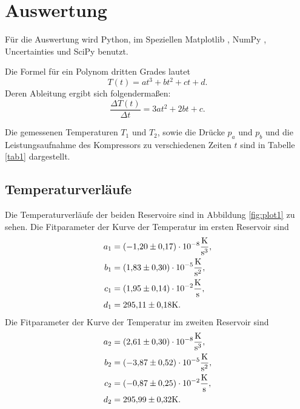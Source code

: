 \section{Auswertung}
\label{sec:Auswertung}
Für die Auswertung wird Python, im Speziellen Matplotlib \cite{matplotlib}, NumPy \cite{numpy}, Uncertainties \cite{uncertainties}
und SciPy \cite{scipy} benutzt.

Die Formel für ein Polynom dritten Grades lautet 
\begin{equation}
    T(t)= at^3+bt^2+ct+d.
    \label{eqn:poly3}
\end{equation}
Deren Ableitung ergibt sich folgendermaßen: 
\begin{equation}
    \frac{\Delta T(t)}{\Delta t}=3at^2+2bt+c.
    \label{eqn:poly3ableitung}
\end{equation}

\noindent Die gemessenen Temperaturen $T_1$ und $T_2$, sowie die Drücke
$p_a$ und $p_b$ und die Leistungsaufnahme des Kompressors
zu verschiedenen Zeiten $t$ sind in Tabelle \ref{tab1}
dargestellt.


\subsection{Temperaturverläufe}
Die Temperaturverläufe der beiden Reservoire sind in Abbildung
\ref{fig:plot1} zu sehen.
Die Fitparameter der Kurve der Temperatur im ersten Reservoir sind 
\begin{align*}
    a_1 &= \num{-1.20(17)e-8} \si{\kelvin\per\cubic\second},\\
    b_1 &= \num{1.83(30)e-5} \si{\kelvin\per\square\second},\\ 
    c_1 &= \num{1.95(14)e-2} \si{\kelvin\per\second}, \\
    d_1 &= \num{295.11 \pm 0.18} \si{\kelvin}. \\
\end{align*}
Die Fitparameter der Kurve der Temperatur im zweiten Reservoir sind 
\begin{align*}
    a_2 &= \num{2.61(30)e-8} \si{\kelvin\per\cubic\second},\\ 
    b_2 &= \num{-3.87(52)e-5} \si{\kelvin\per\square\second}, \\
    c_2 &= \num{-0.87(25)e-2} \si{\kelvin\per\second}, \\
    d_2 &= \num{295.99 \pm 0.32} \si{\kelvin}. \\
\end{align*}


